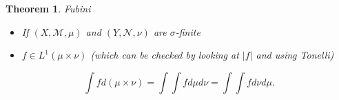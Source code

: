 \documentclass[12pt]{Qual}
\newtheorem{theorem}{Theorem}
\begin{document}
\vspace{0.25cm}
\begin{theorem}{\Large\textit{Fubini}}

\vspace{-0.25cm}
\begin{itemize}[leftmargin=2.5cm]
\setlength\itemsep{-0.1em}
\renewcommand\labelitemi{\faPuzzlePiece}
    \item If $(X,\mathscr{M},\mu)$ and $(Y,\mathscr{N},\nu)$ are $\sigma$-finite
    \item $f\in L^1(\mu\times\nu)$ (which can be checked by looking at $|f|$ and using Tonelli)
\end{itemize}

 $$\int fd(\mu\times\nu)=\int\int fd\mu d\nu=\int\int fd\nu d\mu.$$

\end{theorem}
\vspace{0.25cm}

\newpage
\end{document}
